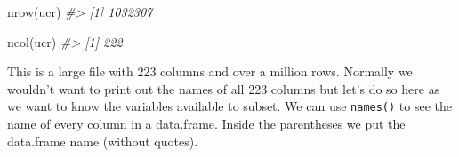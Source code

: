 \documentclass[
]{krantz}
\makeatletter
\newenvironment{Shaded}{\begin{snugshade}}{\end{snugshade}}
\newcommand{\CommentTok}[1]{\textcolor[rgb]{0.37,0.37,0.37}{\textit{#1}}}
\newcommand{\FunctionTok}[1]{\textcolor[rgb]{0,0,0}{#1}}
\newcommand{\NormalTok}[1]{#1}
\newenvironment{kframe}{%
\medskip{}
\setlength{\fboxsep}{.8em}
 \def\at@end@of@kframe{}%
 \ifinner\ifhmode%
  \def\at@end@of@kframe{\end{minipage}}%
  \begin{minipage}{\columnwidth}%
 \fi\fi%
 \def\FrameCommand##1{\hskip\@totalleftmargin \hskip-\fboxsep
 \colorbox{shadecolor}{##1}\hskip-\fboxsep
     \hskip-\linewidth \hskip-\@totalleftmargin \hskip\columnwidth}%
 \MakeFramed {\advance\hsize-\width
   \@totalleftmargin\z@ \linewidth\hsize
   \@setminipage}}%
 {\par\unskip\endMakeFramed%
 \at@end@of@kframe}
\renewenvironment{Shaded}{\begin{kframe}}{\end{kframe}}
\makeatother
\begin{document}
\begin{Shaded}
\begin{Highlighting}[]
\FunctionTok{nrow}\NormalTok{(ucr)}
\CommentTok{\#\textgreater{} [1] 1032307}
\end{Highlighting}
\end{Shaded}

\begin{Shaded}
\begin{Highlighting}[]
\FunctionTok{ncol}\NormalTok{(ucr)}
\CommentTok{\#\textgreater{} [1] 222}
\end{Highlighting}
\end{Shaded}

This is a large file with 223 columns and over a million
rows. Normally we wouldn't want to print out the names of
all 223 columns but let's do so here as we want to know the
variables available to subset. We can use \texttt{names()}
to see the name of every column in a data.frame. Inside the
parentheses we put the data.frame name (without quotes).
\end{document}
